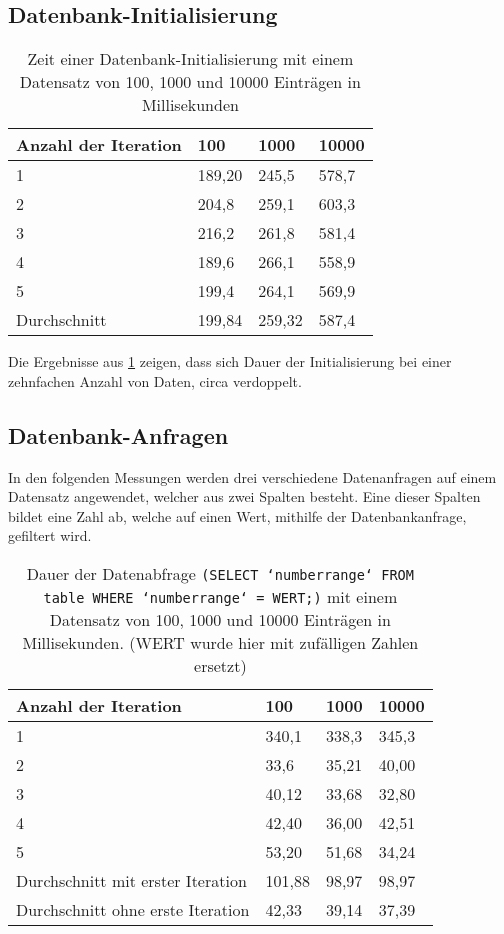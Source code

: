 \subsection{Datenbank-Initialisierung}
\begin{table}[H]
\begin{center}
    \begin{tabular}{| l | l | l | l |}
    \hline
    Anzahl der Iteration & 100 & 1000 & 10000 \\ \hline
    1& 189,20 & 245,5  & 578,7 \\ \hline
    2& 204,8 & 259,1 & 603,3 \\ \hline
    3& 216,2& 261,8 & 581,4 \\ \hline
    4& 189,6 & 266,1 & 558,9 \\ \hline
    5& 199,4 & 264,1 & 569,9 \\ \hline
	Durchschnitt & 199,84 & 259,32 & 587,4\\ \hline
    \end{tabular}
\end{center}
\caption{Zeit einer Datenbank-Initialisierung mit einem Datensatz von 100, 1000 und 10000 Einträgen in Millisekunden}
\label{tabelle_avarage_time}
\end{table}

Die Ergebnisse aus \ref{tabelle_avarage_time} zeigen, dass sich Dauer der Initialisierung bei einer zehnfachen Anzahl von Daten, circa verdoppelt.

\subsection{Datenbank-Anfragen}

In den folgenden Messungen werden drei verschiedene Datenanfragen auf einem Datensatz angewendet, welcher aus zwei Spalten besteht. Eine dieser Spalten bildet eine Zahl ab, welche auf einen Wert, mithilfe der Datenbankanfrage, gefiltert wird.

\begin{table}[H]
\begin{center}
    \begin{tabular}{| l | l | l | l |}
    \hline
    Anzahl der Iteration & 100 & 1000 & 10000 \\ \hline
    1& 340,1 & 338,3  & 345,3 \\ \hline
    2& 33,6 & 35,21 & 40,00\\ \hline
    3& 40,12& 33,68 & 32,80 \\ \hline
    4& 42,40 & 36,00 & 42,51 \\ \hline
    5& 53,20 & 51,68 & 34,24 \\ \hline
	Durchschnitt mit erster Iteration & 101,88 & 98,97 & 98,97\\ \hline
	Durchschnitt ohne erste Iteration & 42,33 & 39,14 & 37,39\\ \hline
    \end{tabular}
\end{center}
\caption{Dauer der Datenabfrage \texttt{(SELECT `numberrange` FROM table WHERE `numberrange` = WERT;)} mit einem Datensatz von 100, 1000 und 10000 Einträgen in Millisekunden. (WERT wurde hier mit zufälligen Zahlen ersetzt)}
\label{equalTabelle}
\end{table}

